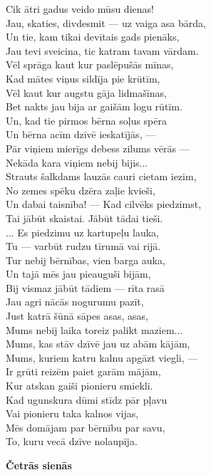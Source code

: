 \documentclass[11pt]{article}
\begin{document}
{Cik ātri gadus veido mūsu dienas!\\
Jau, skaties, divdesmit --- uz vaiga asa bārda,\\
Un tie, kam tikai devītais gads pienāks,\\
Jau tevi sveicina, tic katram tavam vārdam. \\
Vēl sprāga kaut kur paslēpušās mīnas,\\
Kad mātes viņus sildīja pie krūtīm,\\
Vēl kaut kur augstu gāja lidmašīnas,\\
Bet nakts jau bija ar gaišām logu rūtīm.\\
Un, kad tie pirmos bērna soļus spēra\\
Un bērna acīm dzīvē ieskatījās, ---\\
Pār viņiem mierīgs debess zilums vērās ---\\
Nekāda kara viņiem nebij bijis...\\
Strauts šalkdams lauzās cauri cietam iezim,\\
No zemes spēku dzēra zaļie kvieši,\\
Un dabai taisnība! --- Kad cilvēks piedzimst,\\
Tai jābūt skaistai. Jābūt tādai tieši.\\
... Es piedzimu uz kartupeļu lauka,\\
Tu --- varbūt rudzu tīrumā vai rijā.\\
Tur nebij bērnības, vien barga auka,\\
Un tajā mēs jau pieauguši bijām,\\
Bij vismaz jābūt tādiem --- rīta rasā\\
Jau agri nācās nogurumu pazīt,\\
Just katrā šūnā sāpes asas, asas,\\
Mums nebij laika toreiz palikt maziem...\\
Mums, kas stāv dzīvē jau uz abām kājām,\\
Mums, kuriem katru kalnu apgāzt viegli, ---\\
Ir grūti reizēm paiet garām mājām,\\
Kur atskan gaiši pionieru smiekli.\\
Kad ugunskura dūmi stīdz pār pļavu\\
Vai pionieru taka kalnos vijas,\\
Mēs domājam par bērnību par savu,\\
To, kuru vecā dzīve nolaupīja.

\newpage
{\bf Četrās sienās}

}
\end{document}
